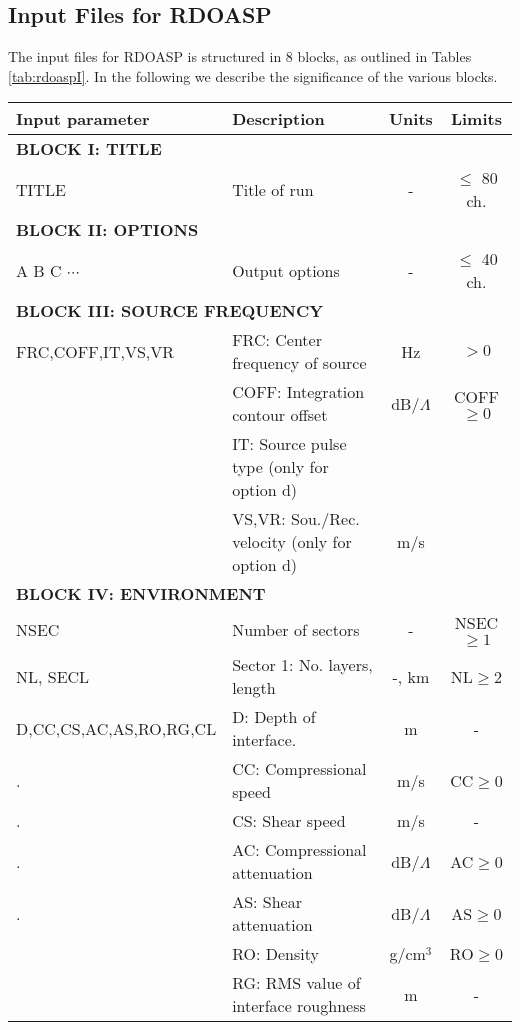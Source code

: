 \subsection{Input Files for RDOASP}

The input files for RDOASP is structured in 8 blocks, as outlined in
Tables\,\ref{tab:rdoaspI}. In the following we
describe the significance of the various blocks.

\begin{table}
\begin{center}
\small
\begin{tabular}{|l|l|c|c|}
\hline \hline
Input parameter & Description & Units & Limits \\
\hline \hline
\multicolumn{4}{|l|}{\bf BLOCK I: TITLE } \\
\hline
TITLE & Title of run  & - & $\leq$ 80 ch. \\
\hline
\multicolumn{4}{|l|}{\bf BLOCK II: OPTIONS} \\
\hline
A B C $\cdots$ & Output options & - & $\leq$ 40 ch. \\
\hline
\multicolumn{4}{|l|}{\bf BLOCK III: SOURCE FREQUENCY} \\
\hline
FRC,COFF,IT,VS,VR & FRC: Center frequency of source & Hz & $>0$ \\
 	& COFF: Integration contour offset & dB/$\Lambda$ & COFF$\geq 0$ \\
        & IT: Source pulse type (only for option d) & & \\
	& VS,VR: Sou./Rec. velocity  (only for option d) & m/s & \\
\hline
\multicolumn{4}{|l|}{\bf BLOCK IV: ENVIRONMENT} \\
\hline
NSEC            & Number of sectors & - & NSEC$\geq 1$ \\
\hline
NL, SECL	& Sector 1: No. layers, length & -, km & NL$\geq 2$  \\
D,CC,CS,AC,AS,RO,RG,CL & D: Depth of interface. & m & - \\
.	& CC: Compressional speed & m/s & CC$\geq 0$ \\
.	& CS: Shear speed & m/s & - \\
.	& AC: Compressional attenuation & dB/$\Lambda$ & AC$\geq 0$ \\
.	& AS: Shear attenuation & dB/$\Lambda$ & AS$\geq 0$ \\
	& RO: Density 	& g/cm$^{3}$ & RO$\geq 0$ \\
	& RG: RMS value of interface roughness & m & - \\

\end{tabular}
\end{center}
\end{table}
